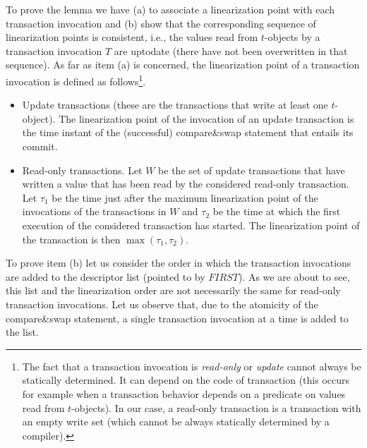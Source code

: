 \begin{proofL}
To prove the lemma we have (a) to associate a linearization point  with 
each  transaction  invocation and (b) show that the corresponding sequence
of linearization points is consistent, i.e., the values read from  
$t$-objects by a transaction  invocation $T$ are uptodate  
(there have not been overwritten in  that sequence). 
As far as  item (a) is concerned, the  linearization  point of 
a transaction invocation is defined as follows\footnote{The 
fact  that a  transaction invocation is {\it read-only} or {\it  update} 
cannot always be statically determined. It can depend on the 
code of transaction (this occurs for example when a transaction  
behavior depends on  a predicate on values read from $t$-objects).
In our case, a read-only transaction   is a transaction with an empty write
set (which cannot be always statically determined   by a compiler).}.
\begin{itemize}
\item Update transactions 
(these are the transactions that write at least one $t$-object). 
The linearization point of the invocation of an update transaction is the time 
instant of the (successful) compare\&swap statement that entails its commit.  
\item Read-only transactions. 
Let $W$  be the set of update  transactions that have written  a value that
has been read 
by the considered read-only transaction. Let $\tau_1$ be the time just after
the maximum linearization point of the invocations of the transactions in $W$ 
and $\tau_2$ be the time at which the first execution 
of the considered transaction has started.
The linearization point of the transaction is then $\max(\tau_1,\tau_2)$.
%
\end{itemize}

To prove item (b) let us consider the order in which  the transaction 
invocations are added to the descriptor list (pointed to by $\mathit{FIRST}$). 
As we are about to see, this  list and the linearization order are not
necessarily the same for read-only transaction invocations.  
Let us observe that, due  to the atomicity of the compare\&swap statement, 
a single transaction  invocation at a time is added to the list.


\end{proofL}
